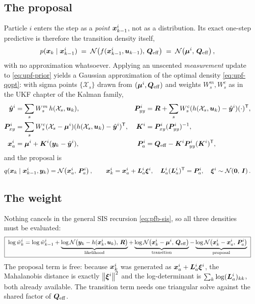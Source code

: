 \subsection{The proposal}
Particle $i$ enters the step as a \emph{point} $\bm{x}_{k-1}^i$, not as a distribution.  Its exact
one-step predictive is therefore the transition density itself,
\begin{equation}
  p(\bm{x}_k\mid\bm{x}_{k-1}^i) \;=\; \mathcal{N}\!\left(f(\bm{x}_{k-1}^i,\bm{u}_{k-1}),\,\bm{Q}_{\mathrm{eff}}\right)
  \;=\; \mathcal{N}\!\left(\bm{\mu}^i,\,\bm{Q}_{\mathrm{eff}}\right),
  \label{eq:upf-prior}
\end{equation}
with no approximation whatsoever.  Applying an unscented \emph{measurement} update to
\eqref{eq:upf-prior} yields a Gaussian approximation of the optimal density \eqref{eq:upf-qopt}:
with sigma points $\{\mathcal{X}_s\}$ drawn from $(\bm\mu^i, \bm{Q}_{\mathrm{eff}})$ and weights
$W_s^m, W_s^c$ as in the UKF chapter of the Kalman family,
\begin{align}
  \hat{\bm{y}}^i &= \sum_s W^m_s\, h(\mathcal{X}_s,\bm{u}_k), &
  \bm{P}^i_{yy} &= \bm{R} + \sum_s W^c_s (h(\mathcal{X}_s,\bm{u}_k)-\hat{\bm{y}}^i)(\cdot)^{\mathsf{T}}, \label{eq:upf-ut1}\\
  \bm{P}^i_{xy} &= \sum_s W^c_s (\mathcal{X}_s - \bm\mu^i)(h(\mathcal{X}_s,\bm{u}_k)-\hat{\bm{y}}^i)^{\mathsf{T}}, &
  \bm{K}^i &= \bm{P}^i_{xy}(\bm{P}^i_{yy})^{-1}, \label{eq:upf-ut2}\\
  \bm{x}_a^i &= \bm\mu^i + \bm{K}^i(\bm{y}_k - \hat{\bm{y}}^i), &
  \bm{P}_a^i &= \bm{Q}_{\mathrm{eff}} - \bm{K}^i\bm{P}^i_{yy}(\bm{K}^i)^{\mathsf{T}}, \label{eq:upf-ut3}
\end{align}
and the proposal is
\begin{equation}
  q(\bm{x}_k\mid\bm{x}_{k-1}^i,\bm{y}_k) = \mathcal{N}\!\left(\bm{x}_a^i,\,\bm{P}_a^i\right), \qquad
  \bm{x}_k^i = \bm{x}_a^i + \bm{L}_a^i\bm\xi^i, \quad \bm{L}_a^i(\bm{L}_a^i)^{\mathsf{T}} = \bm{P}_a^i, \quad \bm\xi^i\sim\mathcal{N}\!\left(\bm 0,\,\bm{I}\right).
  \label{eq:upf-draw}
\end{equation}

\subsection{The weight}
Nothing cancels in the general SIS recursion \eqref{eq:pfb-sis}, so all three densities must be
evaluated:
\begin{equation}
  \boxed{\;
  \log \tilde w_k^i = \log \tilde w_{k-1}^i
    + \underbrace{\log \mathcal{N}\!\left(\bm{y}_k - h(\bm{x}_k^i,\bm{u}_k),\,\bm{R}\right)}_{\text{likelihood}}
    + \underbrace{\log \mathcal{N}\!\left(\bm{x}_k^i - \bm\mu^i,\,\bm{Q}_{\mathrm{eff}}\right)}_{\text{transition}}
    - \underbrace{\log \mathcal{N}\!\left(\bm{x}_k^i - \bm{x}_a^i,\,\bm{P}_a^i\right)}_{\text{proposal}} \;}
  \label{eq:upf-weight}
\end{equation}
The proposal term is free: because $\bm{x}_k^i$ was generated as $\bm{x}_a^i + \bm{L}_a^i\bm\xi^i$, the
Mahalanobis distance is exactly $\left\lVert \bm\xi^i \right\rVert^2$ and the log-determinant is
$\sum_k \log (\bm{L}_a^i)_{kk}$, both already available.  The transition term needs one triangular
solve against the shared factor of $\bm{Q}_{\mathrm{eff}}$.

